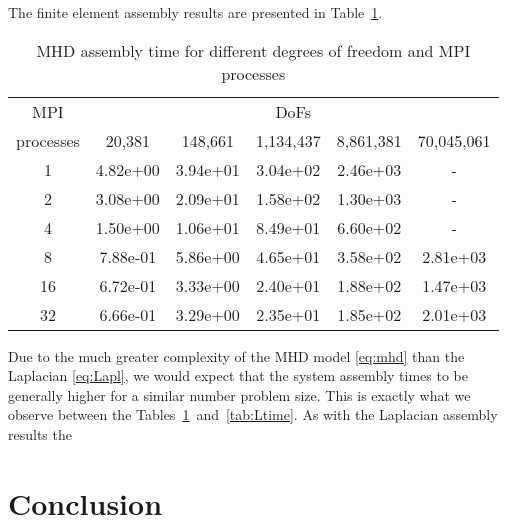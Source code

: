 \documentclass[10pt]{article}
\begin{document}
The finite element assembly results are presented in Table~\ref{tab:MHD}.
\begin{table}[h!]
    \centering
    \begin{tabular}{|c|ccccc|}
        \hline
        MPI & \multicolumn{5}{c|}{DoFs}\\
        processes &  20,381   &   148,661  &   1,134,437  &   8,861,381  & 70,045,061 \\
        \hline
        1 & 4.82e+00 &  3.94e+01 &  3.04e+02 &  2.46e+03 &  - \\
        2 & 3.08e+00 &  2.09e+01 &  1.58e+02 &  1.30e+03 &  - \\
        4 & 1.50e+00 &  1.06e+01 &  8.49e+01 &  6.60e+02 &  - \\
        8 & 7.88e-01 &  5.86e+00 &  4.65e+01 &  3.58e+02 &  2.81e+03 \\
        16 & 6.72e-01 &  3.33e+00 &  2.40e+01 &  1.88e+02 &  1.47e+03 \\
        32 & 6.66e-01 &  3.29e+00 &  2.35e+01 &  1.85e+02 &  2.01e+03 \\
        \hline
    \end{tabular}
    \caption{MHD assembly time for different degrees of freedom and MPI processes}
    \label{tab:MHD}
\end{table}
Due to the much greater complexity of the MHD model \eqref{eq:mhd} than the Laplacian \eqref{eq:Lapl}, we would expect that the system assembly times to be generally higher for a similar number problem size. This is exactly what we observe between the Tables~\ref{tab:MHD}~and~\ref{tab:Ltime}. As with the Laplacian assembly results the

\section{Conclusion}




\end{document}
